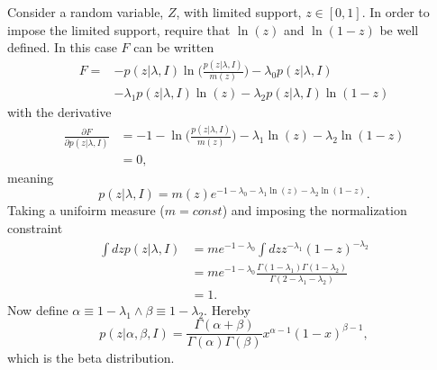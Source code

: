 \begin{example}
	Consider a random variable, $Z$, with limited support, $z\in [0,1]$. In order to impose the limited support, require that $\ln(z)$ and $\ln(1-z)$ be well defined. In this case $F$ can be written\label{ex:beta}
	\begin{equation}
		\begin{split}
			F =& -p(z|\lambda,I)\ln\bigg(\frac{p(z|\lambda,I)}{m(z)}\bigg)-\lambda_0p(z|\lambda,I)\\
			&-\lambda_1p(z|\lambda,I)\ln(z)-\lambda_2p(z|\lambda,I)\ln(1-z)
		\end{split}
	\end{equation}
	with the derivative
	\begin{equation}
		\begin{split}
			\frac{\partial F}{\partial p(z|\lambda,I)} &= -1-\ln\bigg(\frac{p(z|\lambda,I)}{m(z)}\bigg)-\lambda_1\ln(z)-\lambda_2\ln(1-z)\\
			&=0,
		\end{split}
	\end{equation}
	meaning
	\begin{equation}
		p(z|\lambda,I)=m(z)e^{-1-\lambda_0-\lambda_1\ln(z)-\lambda_2\ln(1-z)}.
	\end{equation}
	Taking a unifoirm measure ($m= const$) and imposing the normalization constraint
	\begin{equation}
		\begin{split}
			\int dz p(z|\lambda,I) &= me^{-1-\lambda_0}\int dz z^{-\lambda_1}(1-z)^{-\lambda_2}\\
			&= me^{-1-\lambda_0}\frac{\Gamma(1-\lambda_1)\Gamma(1-\lambda_2)}{\Gamma(2-\lambda_1-\lambda_2)}\\
			&=1.
		\end{split}
	\end{equation}
	Now define $\alpha \equiv 1-\lambda_1\wedge \beta \equiv 1-\lambda_2$. Hereby
	\begin{equation}
		p(z|\alpha,\beta,I) = \frac{\Gamma(\alpha+\beta)}{\Gamma(\alpha)\Gamma(\beta)}x^{\alpha-1}(1-x)^{\beta-1},
	\end{equation}
	which is the beta distribution. 
\end{example}


